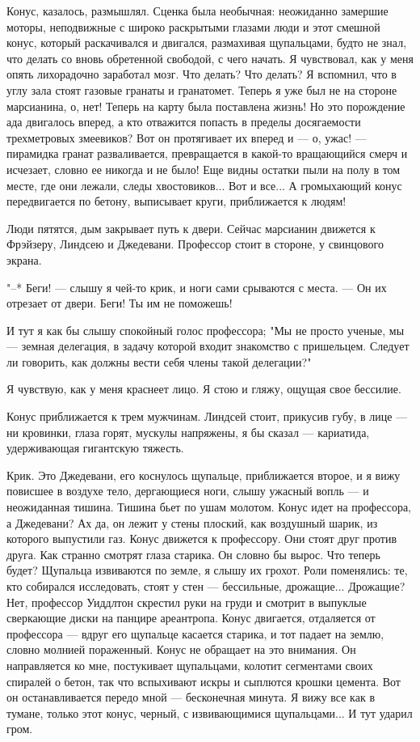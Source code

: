 Конус, казалось, размышлял. Сценка была необычная: неожиданно  замершие
моторы, неподвижные с широко раскрытыми глазами люди и этот смешной конус,
который раскачивался и двигался, размахивая щупальцами, будто не знал, что
делать со вновь обретенной свободой, с чего начать. Я  чувствовал,  как  у
меня опять лихорадочно заработал мозг. Что делать? Что делать? Я вспомнил,
что в углу зала стоят газовые гранаты и гранатомет. Теперь я уже был не на
стороне марсианина, о, нет! Теперь на карту была поставлена жизнь! Но  это
порождение ада  двигалось  вперед,  а  кто  отважится  попасть  в  пределы
досягаемости трехметровых змеевиков? Вот он протягивает их вперед и  ---  о,
ужас!  ---  пирамидка  гранат   разваливается,   превращается   в   какой-то
вращающийся смерч и исчезает, словно ее  никогда  и  не  было!  Еще  видны
остатки пыли на полу в том месте, где они лежали, следы хвостовиков... Вот
и все... А громыхающий конус передвигается по  бетону,  выписывает  круги,
приближается к людям!

Люди пятятся, дым закрывает путь к двери. Сейчас марсианин  движется  к
Фрэйзеру, Линдсею и Джедевани. Профессор стоит  в  стороне,  у  свинцового
экрана.

"--* Беги! --- слышу я чей-то крик, и ноги сами срываются с места. ---  Он  их
отрезает от двери. Беги! Ты им не поможешь!

И тут я как бы слышу спокойный голос профессора; "Мы не просто  ученые,
мы --- земная делегация, в задачу которой входит  знакомство  с  пришельцем.
Следует ли говорить, как должны вести себя члены такой делегации?"

Я чувствую, как у меня краснеет лицо.  Я  стою  и  гляжу,  ощущая  свое
бессилие.

Конус приближается к трем мужчинам. Линдсей  стоит,  прикусив  губу,  в
лице --- ни  кровинки,  глаза  горят,  мускулы  напряжены,  я  бы  сказал  ---
кариатида, удерживающая гигантскую тяжесть.

Крик. Это Джедевани, его коснулось щупальце, приближается второе,  и  я
вижу повисшее в воздухе тело, дергающиеся ноги, слышу ужасный  вопль  ---  и
неожиданная тишина. Тишина бьет по ушам молотом. Конус идет на профессора,
а Джедевани? Ах да, он лежит у стены  плоский,  как  воздушный  шарик,  из
которого выпустили газ. Конус движется к профессору. Они стоят друг против
друга. Как странно смотрят глаза старика. Он словно бы вырос.  Что  теперь
будет? Щупальца извиваются по земле, я слышу их грохот.  Роли  поменялись:
те, кто собирался исследовать, стоят  у  стен  ---  бессильные,  дрожащие...
Дрожащие? Нет, профессор Уиддлтон скрестил  руки  на  груди  и  смотрит  в
выпуклые  сверкающие  диски  на  панцире  ареантропа.   Конус   двигается,
отдаляется от профессора --- вдруг его  щупальце  касается  старика,  и  тот
падает на землю, словно молнией  пораженный.  Конус  не  обращает  на  это
внимания.  Он  направляется  ко  мне,  постукивает   щупальцами,   колотит
сегментами своих спиралей о бетон, так что  вспыхивают  искры  и  сыплются
крошки цемента. Вот он останавливается передо мной --- бесконечная минута. Я
вижу все  как  в  тумане,  только  этот  конус,  черный,  с  извивающимися
щупальцами... И тут ударил гром.

